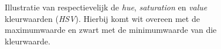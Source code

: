 \documentclass[a4paper,kulak]{kulakarticle}
\begin{document}
\begin{figure}[H]
	\centering
	\qquad
	\qquad
	
	\caption{Illustratie van respectievelijk de \textit{hue}, \textit{saturation} en \textit{value} kleurwaarden (\textit{HSV}). Hierbij komt wit overeen met de maximumwaarde en zwart met de minimumwaarde van die kleurwaarde.}
	\label{figuur HSV}
\end{figure}
\end{document}
